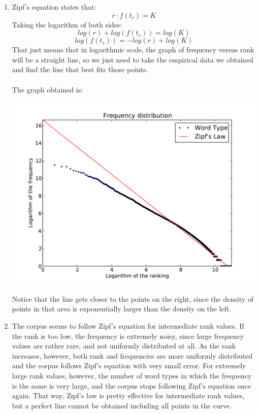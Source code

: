 \documentclass[11pt]{article}
\begin{document}
\begin {enumerate}
\item
Zipf's equation states that:
$$r\cdot f(t_r)=K$$
Taking the logarithm of both sides:
$$log(r)+log( f(t_r))=log(K)$$
$$log( f(t_r))=-log(r)+log(K)$$
That just means that in logarithmic scale, the graph of frequency versus rank will be a straight line, so we just need to take the empirical data we obtained and find the line that best fits those points.
\\
\\
The graph obtained is:
\begin{center}
\includegraphics[width=140mm]{graph.pdf}
\end{center}

Notice that the line gets closer to the points on the right, since the density of points in that area is exponentially larger than the density on the left.
\item
The corpus seems to follow Zipf's equation for intermediate rank values. If the rank is too low, the frequency is extremely noisy, since large frequency values are rather rare, and not uniformly distributed at all. As the rank increases, however, both rank and frequencies are more uniformly distributed and the corpus follows Zipf's equation with very small error. For extremely large rank values, however, the number of word types in which the frequency is the same is very large, and the corpus stops following Zipf's equation once again. That way, Zipf's law is pretty effective for intermediate rank values, but a perfect line cannot be obtained including all points in the curve.

\end{enumerate}
\end{document}
